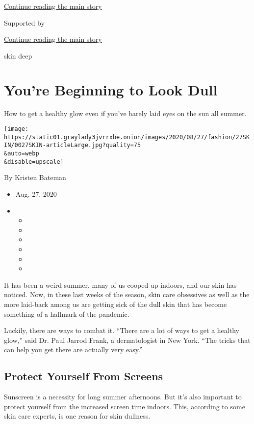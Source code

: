 \protect\hyperlink{after-top}{Continue reading the main story}

Supported by

\protect\hyperlink{after-sponsor}{Continue reading the main story}

skin deep

\hypertarget{youre-beginning-to-look-dull}{%
\section{You're Beginning to Look
Dull}\label{youre-beginning-to-look-dull}}

How to get a healthy glow even if you've barely laid eyes on the sun all
summer.

\texttt{[image: https://static01.graylady3jvrrxbe.onion/images/2020/08/27/fashion/27SKIN/0027SKIN-articleLarge.jpg?quality=75\\\&auto=webp\\\&disable=upscale]}

By Kristen Bateman

\begin{itemize}
\item
  Aug. 27, 2020
\item
  \begin{itemize}
  \item
  \item
  \item
  \item
  \item
  \item
  \end{itemize}
\end{itemize}

It has been a weird summer, many of us cooped up indoors, and our skin
has noticed. Now, in these last weeks of the season, skin care
obsessives as well as the more laid-back among us are getting sick of
the dull skin that has become something of a hallmark of the pandemic.

Luckily, there are ways to combat it. ``There are a lot of ways to get a
healthy glow,'' said Dr. Paul Jarrod Frank, a dermatologist in New York.
``The tricks that can help you get there are actually very easy.''

\hypertarget{protect-yourself-from-screens}{%
\subsection{Protect Yourself From
Screens}\label{protect-yourself-from-screens}}

Sunscreen is a necessity for long summer afternoons. But it's also
important to protect yourself from the increased screen time indoors.
This, according to some skin care experts, is one reason for skin
dullness.

